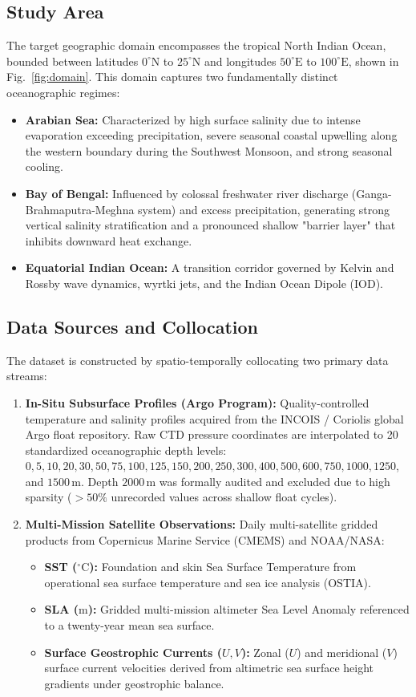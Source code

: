 \documentclass[conference]{IEEEtran}
\begin{document}
\subsection{Study Area}
The target geographic domain encompasses the tropical North Indian Ocean, bounded between latitudes $0^\circ\text{N}$ to $25^\circ\text{N}$ and longitudes $50^\circ\text{E}$ to $100^\circ\text{E}$, shown in Fig.~\ref{fig:domain}. This domain captures two fundamentally distinct oceanographic regimes:
\begin{itemize}
    \item \textbf{Arabian Sea:} Characterized by high surface salinity due to intense evaporation exceeding precipitation, severe seasonal coastal upwelling along the western boundary during the Southwest Monsoon, and strong seasonal cooling.
    \item \textbf{Bay of Bengal:} Influenced by colossal freshwater river discharge (Ganga-Brahmaputra-Meghna system) and excess precipitation, generating strong vertical salinity stratification and a pronounced shallow "barrier layer" that inhibits downward heat exchange.
    \item \textbf{Equatorial Indian Ocean:} A transition corridor governed by Kelvin and Rossby wave dynamics, wyrtki jets, and the Indian Ocean Dipole (IOD).
\end{itemize}

\subsection{Data Sources and Collocation}
The dataset is constructed by spatio-temporally collocating two primary data streams:
\begin{enumerate}
    \item \textbf{In-Situ Subsurface Profiles (Argo Program):} Quality-controlled temperature and salinity profiles acquired from the INCOIS / Coriolis global Argo float repository. Raw CTD pressure coordinates are interpolated to 20 standardized oceanographic depth levels: $0, 5, 10, 20, 30, 50, 75, 100, 125, 150, 200, 250, 300, 400, 500, 600, 750, 1000, 1250$, and $1500\,\text{m}$. Depth $2000\,\text{m}$ was formally audited and excluded due to high sparsity ($>50\%$ unrecorded values across shallow float cycles).
    \item \textbf{Multi-Mission Satellite Observations:} Daily multi-satellite gridded products from Copernicus Marine Service (CMEMS) and NOAA/NASA:
    \begin{itemize}
        \item \textbf{SST ($^\circ\text{C}$):} Foundation and skin Sea Surface Temperature from operational sea surface temperature and sea ice analysis (OSTIA).
        \item \textbf{SLA ($\text{m}$):} Gridded multi-mission altimeter Sea Level Anomaly referenced to a twenty-year mean sea surface.
        \item \textbf{Surface Geostrophic Currents ($U, V$):} Zonal ($U$) and meridional ($V$) surface current velocities derived from altimetric sea surface height gradients under geostrophic balance.
    \end{itemize}
\end{enumerate}
\end{document}
